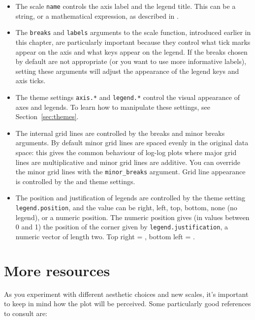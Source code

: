 \begin{itemize}
  \item The scale {\tt name} controls the axis label and the legend title.  This can be a string, or a mathematical expression, as described in .
  
  \item The {\tt breaks} and {\tt labels} arguments to the scale function, introduced earlier in this chapter, are particularly important because they control what tick marks appear on the axis and what keys appear on the legend.  If the breaks chosen by default are not appropriate (or you want to use more informative labels), setting these arguments will adjust the appearance of the legend keys and axis ticks.  
  
  \item The theme settings {\tt axis.*} and {\tt legend.*} control the visual appearance of axes and legends.  To learn how to manipulate these settings, see Section~\ref{sec:themes}.

  \item The internal grid lines are controlled by the breaks and minor breaks arguments.  By default minor grid lines are spaced evenly in the original data space: this gives the common behaviour of log-log plots where major grid lines are multiplicative and minor grid lines are additive.  You can override the minor grid lines with the {\tt minor\_breaks} argument.  Grid line appearance is controlled by the  and  theme settings.

  \item The position and justification of legends are controlled by the theme setting {\tt legend.position}, and the value can be right, left, top, bottom, none (no legend), or a numeric position.  The numeric position gives (in values between 0 and 1) the position of the corner given by {\tt legend.justification}, a numeric vector of length two.  Top right = , bottom left = .
  
\end{itemize}

\section{More resources}
\label{sec:scale-resources}

As you experiment with different aesthetic choices and new scales, it's important to keep in mind how the plot will be perceived.   Some particularly good references to consult are:

